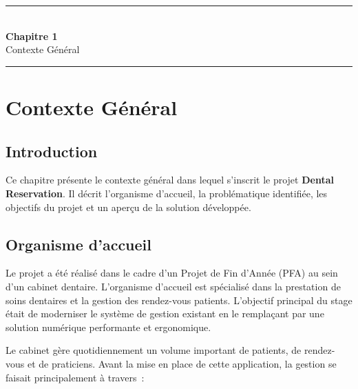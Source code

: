 
\clearpage
\thispagestyle{chaptertitlepage}
\vspace*{\fill}
\begin{center}
\rule{\textwidth}{0.4pt}\\[0.8cm]
{\fontsize{24}{29}\selectfont\bfseries Chapitre 1}\\[0.6cm]
{\fontsize{18}{22}\selectfont Contexte Général}\\[0.8cm]
\rule{\textwidth}{0.4pt}
\end{center}
\vspace*{\fill}
\clearpage

\chapter{Contexte Général}

\section{Introduction}

Ce chapitre présente le contexte général dans lequel s'inscrit le projet \textbf{Dental Reservation}. Il décrit l'organisme d'accueil, la problématique identifiée, les objectifs du projet et un aperçu de la solution développée.

\section{Organisme d'accueil}

Le projet a été réalisé dans le cadre d'un Projet de Fin d'Année (PFA) au sein d'un cabinet dentaire. L'organisme d'accueil est spécialisé dans la prestation de soins dentaires et la gestion des rendez-vous patients. L'objectif principal du stage était de moderniser le système de gestion existant en le remplaçant par une solution numérique performante et ergonomique.

Le cabinet gère quotidiennement un volume important de patients, de rendez-vous et de praticiens. Avant la mise en place de cette application, la gestion se faisait principalement à travers~:

